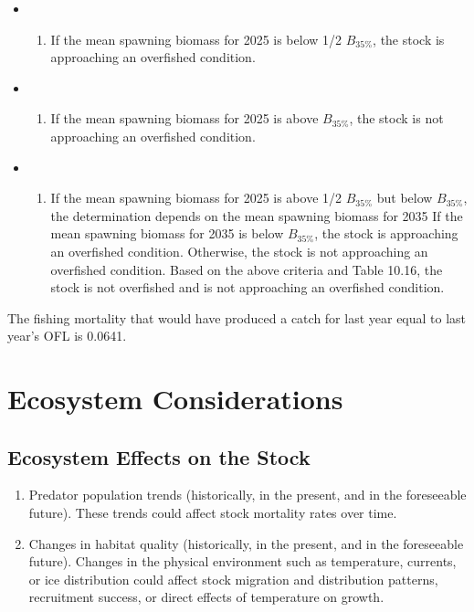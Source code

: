 \documentclass[
  11pt,
]{article}
\providecommand{\tightlist}{%
  \setlength{\itemsep}{0pt}\setlength{\parskip}{0pt}}
\begin{document}
\begin{itemize}
\item
  \begin{enumerate}
  \def\labelenumi{\alph{enumi}.}
  \tightlist
  \item
    If the mean spawning biomass for 2025 is below 1/2 \(B_{35\%}\), the stock is approaching an overfished condition.
  \end{enumerate}
\item
  \begin{enumerate}
  \def\labelenumi{\alph{enumi}.}
  \setcounter{enumi}{1}
  \tightlist
  \item
    If the mean spawning biomass for 2025 is above \(B_{35\%}\), the stock is not approaching an overfished condition.
  \end{enumerate}
\item
  \begin{enumerate}
  \def\labelenumi{\alph{enumi}.}
  \setcounter{enumi}{2}
  \tightlist
  \item
    If the mean spawning biomass for 2025 is above 1/2 \(B_{35\%}\) but below \(B_{35\%}\), the determination depends on the mean spawning biomass for 2035
    If the mean spawning biomass for 2035 is below \(B_{35\%}\), the stock is approaching an overfished condition.
    Otherwise, the stock is not approaching an overfished condition.
    Based on the above criteria and Table 10.16, the stock is not overfished and is not approaching an overfished condition.
  \end{enumerate}
\end{itemize}

The fishing mortality that would have produced a catch for last year equal to last year's OFL is 0.0641.

\hypertarget{ecosystem-considerations}{%
\section{Ecosystem Considerations}\label{ecosystem-considerations}}

\hypertarget{ecosystem-effects-on-the-stock}{%
\subsection{Ecosystem Effects on the Stock}\label{ecosystem-effects-on-the-stock}}

\begin{enumerate}
\def\labelenumi{\arabic{enumi}.}
\tightlist
\item
  Predator population trends (historically, in the present, and in the foreseeable future). These trends could affect stock mortality rates over time.
\item
  Changes in habitat quality (historically, in the present, and in the foreseeable future). Changes in the physical environment such as temperature, currents, or ice distribution could affect stock migration and distribution patterns, recruitment success, or direct effects of temperature on growth.
\end{enumerate}
\end{document}
